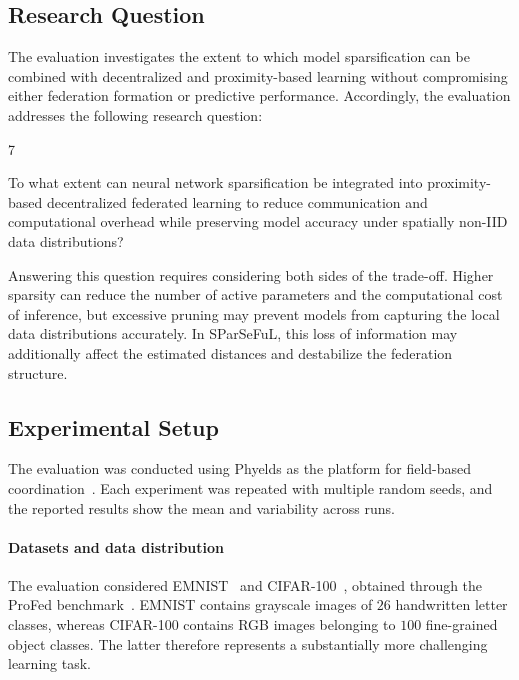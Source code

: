 \subsection{Research Question}
\label{sec:sparseful-rq}

The evaluation investigates the extent to which model sparsification can be
 combined with decentralized and proximity-based learning without compromising
 either federation formation or predictive performance.
%
Accordingly, 
 the evaluation addresses the following research question:

\begin{chapRQ}{7}
  \item
  To what extent can neural network sparsification be integrated into
  proximity-based decentralized federated learning to reduce communication
  and computational overhead while preserving model accuracy under spatially
  non-IID data distributions?
  \label{rq:sparseful}
\end{chapRQ}

Answering this question requires considering both sides of the trade-off.
%
Higher sparsity can reduce the number of active parameters 
 and the computational cost of inference, 
 but excessive pruning may prevent models from
 capturing the local data distributions accurately.
%
In SParSeFuL, 
 this loss of information may additionally affect the estimated
 distances and destabilize the federation structure.

\subsection{Experimental Setup}
\label{sec:sparseful-setup}

The evaluation was conducted using Phyelds as the platform for field-based
 coordination~\cite{DBLP:conf/coordination/AguzziDFV26}.
%
Each experiment was repeated with multiple random seeds, 
 and the reported results show the mean and variability across runs.

\paragraph{Datasets and data distribution}

The evaluation considered EMNIST~\cite{DBLP:journals/corr/CohenATS17} and
 CIFAR-100~\cite{krizhevsky2009learning}, obtained through the
 ProFed benchmark~\cite{DBLP:journals/jors/DominiIALV26}.
%
EMNIST contains grayscale images of \(26\) handwritten letter classes, 
 whereas CIFAR-100 contains RGB images belonging to \(100\) fine-grained object classes.
%
The latter therefore represents a substantially more challenging learning task.


